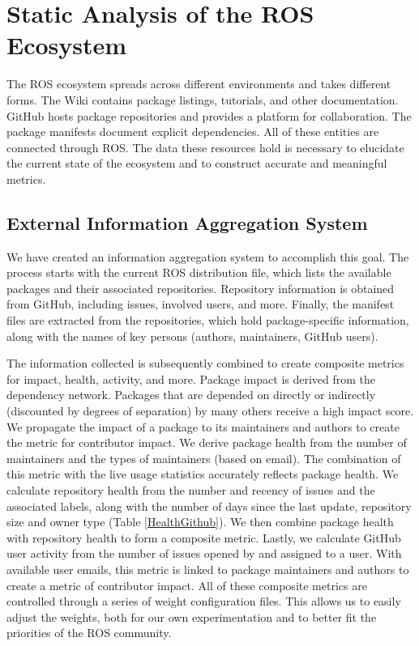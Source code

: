 \documentclass[letterpaper, 10 pt, conference]{ieeeconf}  %
\begin{document}
\section{Static Analysis of the ROS Ecosystem}

The ROS ecosystem spreads across different environments and takes different forms. The Wiki contains package listings, tutorials, and other documentation. GitHub hosts package repositories and provides a platform for collaboration. The package manifests document explicit dependencies. All of these entities are connected through ROS. The data these resources hold is necessary to elucidate the current state of the ecosystem and to construct accurate and meaningful metrics.

\subsection{External Information Aggregation System}
We have created an information aggregation system to accomplish this goal. The process starts with the current ROS distribution file, which lists the available packages and their associated repositories. Repository information is obtained from GitHub, including issues, involved users, and more. Finally, the manifest files are extracted from the repositories, which hold package-specific information, along with the names of key persons (authors, maintainers, GitHub users).

The information collected is subsequently combined to create composite metrics for impact, health, activity, and more. Package impact is derived from the dependency network. Packages that are depended on directly or indirectly (discounted by degrees of separation) by many others receive a high impact score. We propagate the impact of a package to its maintainers and authors to create the metric for contributor impact. We derive package health from the number of maintainers and the types of maintainers (based on email). The combination of this metric with the live usage statistics accurately reflects package health. We calculate repository health from the number and recency of issues and the associated labels, along with the number of days since the last update, repository size and owner type (Table \ref{HealthGithub}). We then combine package health with repository health to form a composite metric. Lastly, we calculate GitHub user activity from the number of issues opened by and assigned to a user. With available user emails, this metric is linked to package maintainers and authors to create a metric of contributor impact. All of these composite metrics are controlled through a series of weight configuration files. This allows us to easily adjust the weights, both for our own experimentation and to better fit the priorities of the ROS community.
\end{document}

